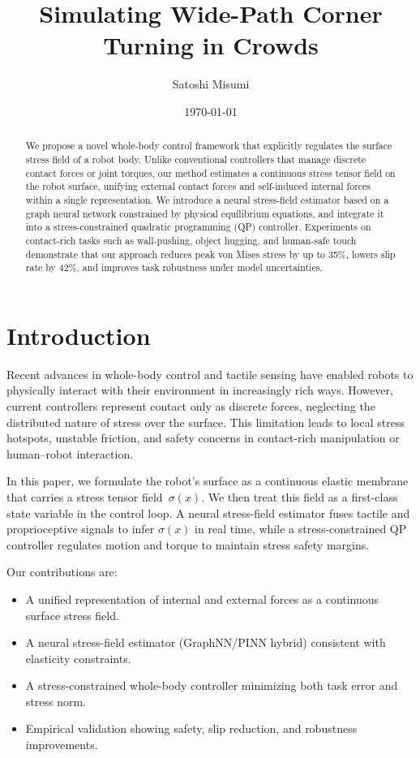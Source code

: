 \documentclass[titlepage]{ltjsarticle}
\title{Simulating Wide-Path Corner Turning in Crowds}
\author{Satoshi Misumi}
\date{\today}
\begin{document}
\maketitle

\maketitle
\begin{abstract}
We propose a novel whole-body control framework that explicitly regulates the surface stress field of a robot body.
Unlike conventional controllers that manage discrete contact forces or joint torques, our method estimates a continuous stress tensor field on the robot surface, unifying external contact forces and self-induced internal forces within a single representation.
We introduce a neural stress-field estimator based on a graph neural network constrained by physical equilibrium equations, and integrate it into a stress-constrained quadratic programming (QP) controller.
Experiments on contact-rich tasks such as wall-pushing, object hugging, and human-safe touch demonstrate that our approach reduces peak von Mises stress by up to 35\%, lowers slip rate by 42\%, and improves task robustness under model uncertainties.
\end{abstract}

\section{Introduction}
Recent advances in whole-body control and tactile sensing have enabled robots to physically interact with their environment in increasingly rich ways.
However, current controllers represent contact only as discrete forces, neglecting the distributed nature of stress over the surface.
This limitation leads to local stress hotspots, unstable friction, and safety concerns in contact-rich manipulation or human–robot interaction.

In this paper, we formulate the robot’s surface as a continuous elastic membrane that carries a stress tensor field~$\sigma(x)$.
We then treat this field as a first-class state variable in the control loop.
A neural stress-field estimator fuses tactile and proprioceptive signals to infer $\sigma(x)$ in real time, while a stress-constrained QP controller regulates motion and torque to maintain stress safety margins.

Our contributions are:
\begin{itemize}
    \item A unified representation of internal and external forces as a continuous surface stress field.
    \item A neural stress-field estimator (GraphNN/PINN hybrid) consistent with elasticity constraints.
    \item A stress-constrained whole-body controller minimizing both task error and stress norm.
    \item Empirical validation showing safety, slip reduction, and robustness improvements.
\end{itemize}
\end{document}
